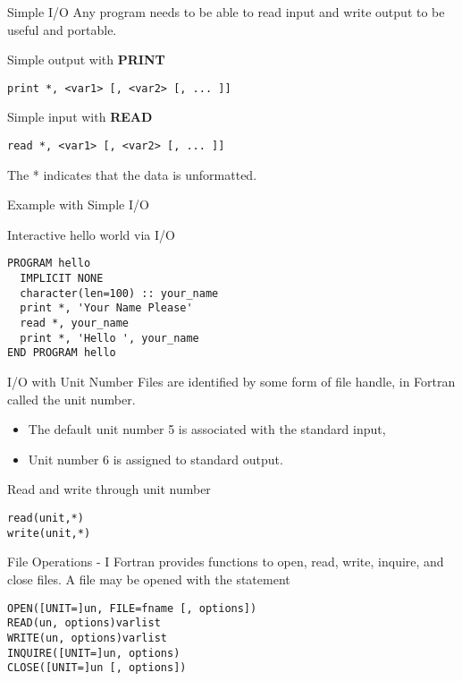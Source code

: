 \begin{frame}[fragile]{Simple I/O}
Any program needs to be able to read input and write output to
be useful and portable.
\begin{block}{Simple output with \textbf{PRINT}}
\begin{lstlisting}
print *, <var1> [, <var2> [, ... ]]
\end{lstlisting}
\end{block}
\begin{block}{Simple input with \textbf{READ}}
\begin{lstlisting}
read *, <var1> [, <var2> [, ... ]]
\end{lstlisting}
\end{block}
The * indicates that the data is unformatted.
\end{frame}


\begin{frame}[fragile]{Example with Simple I/O}
\begin{block}{Interactive hello world via I/O}
\begin{lstlisting}
PROGRAM hello
  IMPLICIT NONE
  character(len=100) :: your_name
  print *, 'Your Name Please'
  read *, your_name
  print *, 'Hello ', your_name
END PROGRAM hello
\end{lstlisting}
\end{block}
\end{frame}

\begin{frame}[fragile]{I/O with Unit Number}
Files are identified by some form of file handle, in Fortran called
the unit number. 
\begin{itemize}
 \item The default unit number 5 is associated with the standard input,
 \item Unit number 6 is assigned to standard output.
\end{itemize}
\begin{block}{Read and write through unit number}
\begin{lstlisting}
read(unit,*)
write(unit,*)
\end{lstlisting}
\end{block}
\end{frame}

\begin{frame}[fragile]{File Operations - I}
Fortran provides functions to open, read, write, inquire, and close files.
A file may be opened with the statement
\begin{lstlisting}
OPEN([UNIT=]un, FILE=fname [, options])
READ(un, options)varlist
WRITE(un, options)varlist
INQUIRE([UNIT=]un, options)
CLOSE([UNIT=]un [, options])
\end{lstlisting}
\end{frame}

